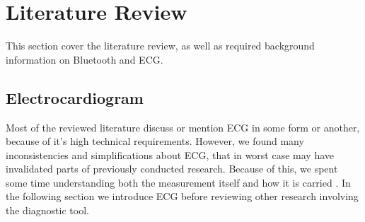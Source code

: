 \section{Literature Review} %
\label{sec:literature_review}


This section cover the literature review, as well as required background information on Bluetooth and ECG.

\subsection{Electrocardiogram} %
\label{sub:electrocardiogram}

Most of the reviewed literature discuss or mention ECG in some form or another, because of it's high technical requirements. However, we found many inconsistencies and simplifications about ECG, that in worst case may have invalidated parts of previously conducted research. Because of this, we spent some time understanding both the measurement itself and how it is carried . In the following section we introduce ECG before reviewing other research involving the diagnostic tool.


